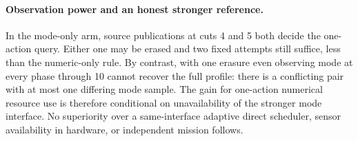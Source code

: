 \documentclass{article}
\begin{document}
\paragraph{Observation power and an honest stronger reference.}
In the mode-only arm, source publications at cuts 4 and 5 both
decide the one-action query. Either one may be erased and two
fixed attempts still suffice, less than the numeric-only rule.
By contrast, with one erasure even observing mode at every
phase through 10 cannot recover the full profile: there is a
conflicting pair with at most one differing mode sample.
The gain for one-action numerical resource use is therefore
conditional on unavailability of the stronger mode interface.
No superiority over a same-interface adaptive direct scheduler,
sensor availability in hardware, or independent mission follows.
\end{document}
